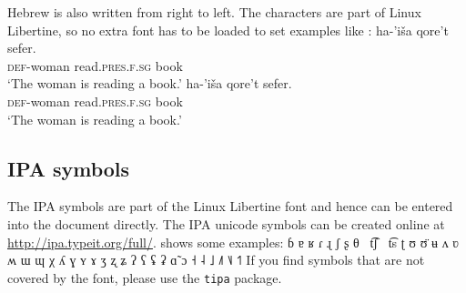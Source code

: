 Hebrew is also written from right to left. The characters are part of Linux Libertine, so no extra
font has to be loaded to set examples like :
\ea\label{ex:latex:hebrew}
\gll   ha-'iša          qore't                            sefer.\\
       {\scshape def}-woman  read.{\scshape pres}.{\scshape f}.{\scshape sg}  book\\
\glt `The woman is reading a book.'
\z
\ea
\gll   ha-'iša          qore't                            sefer.\\
       {\scshape def}-woman  read.{\scshape pres}.{\scshape f}.{\scshape sg}  book\\
\glt `The woman is reading a book.'
\z

\subsection{IPA symbols}

The IPA symbols are part of the Linux Libertine font and hence can be entered into the document
directly. The IPA unicode symbols can be created online at
\url{http://ipa.typeit.org/full/}.  shows some examples:
\ea\label{ex:showcases:IPA}
ɓ ɐ ʁ ɾ ɻ ʃ ʂ θ~  t͡ʃ~  t͡s  ʈ ʊ ʊ̈ ʉ ʌ ʋ ʍ ɯ ɰ χ ʎ ɣ ʏ ɤ ʒ ʐ ʑ ʔ ʕ ʢ ʡ ɑ̃ ɔ ˧ ˨ ˩ ˩˥ ˥˩ ˦˥
\z
If you find symbols that are not covered by the font, please use the \texttt{tipa} package.
 
